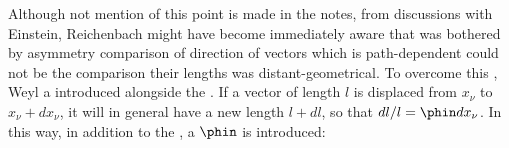 



Although not mention of this point is made in the notes, from discussions with Einstein, Reichenbach might have become immediately aware that \citep{Weyl1918a,Weyl1919a} was bothered by asymmetry comparison of direction of vectors which is path-dependent could not be the comparison their lengths was distant-geometrical. To overcome this , Weyl a introduced  alongside the . If a vector of length $l$ is displaced from $x_\nu$ to $x_\nu+dx_\nu$, it will in general have a new length $l+dl$, so that $dl/l=\phin dx_\nu$. In this way, in addition to the  \gmn, a  $\phin$ is introduced:


